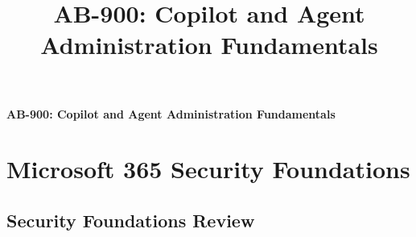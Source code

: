 \documentclass[10pt]{article}
\title{AB-900: Copilot and Agent Administration Fundamentals}
\author{}
\date{}
\begin{document}
\begin{titlepage}
\thispagestyle{empty}
\vspace*{\fill}
\begin{center}
{\LARGE\bfseries AB-900: Copilot and Agent Administration Fundamentals\par}
\end{center}
\vspace*{\fill}
\end{titlepage}
\tableofcontents
\newpage

\setcounter{section}{0}
\section{Microsoft 365 Security Foundations}
\setcounter{subsection}{0}
\clearpage
\subsection{Security Foundations Review}
\end{document}
